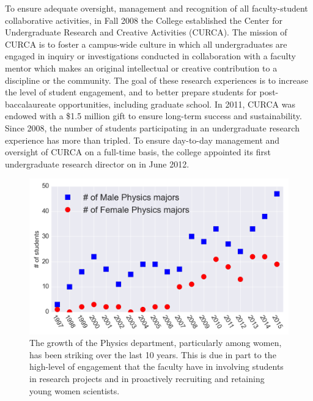 \documentclass[12pt, preprint]{aastex}
\begin{document}

				

To ensure adequate oversight, management and recognition of all faculty-student
collaborative activities, in Fall 2008 the College established the Center for
Undergraduate Research and Creative Activities (CURCA). The mission of CURCA is
to foster a campus-wide culture in which all undergraduates are engaged in
inquiry or investigations conducted in collaboration with a faculty mentor which
makes an original intellectual or creative contribution to a discipline or the
community.  The goal of these research experiences is to increase the level of
student engagement, and to better prepare students for post-baccalaureate
opportunities, including graduate school. In 2011, CURCA was endowed with a
\$1.5 million gift to ensure long-term success and sustainability. Since 2008,
the number of students participating in an undergraduate research experience has
more than tripled. To ensure day-to-day management and oversight of CURCA on a
full-time basis, the college appointed its first undergraduate research director
on in June 2012.



\begin{figure}
\centering
\includegraphics[height=0.29\textheight]{dept_plot.png}
\caption{The growth of the Physics department, particularly among women, has
  been striking over the last 10 years.  This is due in part to the high-level
  of engagement that the faculty have in involving students in research projects
  and in proactively recruiting and retaining young women scientists.
\label{fig:dept}}
\end{figure}
\end{document}
